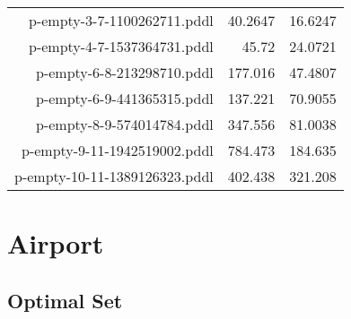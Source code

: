 \documentclass{article}
\begin{document}
\begin{center}
\begin{tabular}{r|r|r}
 p-empty-3-7-1100262711.pddl&40.2647&16.6247\\
 p-empty-4-7-1537364731.pddl&45.72&24.0721\\
 p-empty-6-8-213298710.pddl&177.016&47.4807\\
 p-empty-6-9-441365315.pddl&137.221&70.9055\\
 p-empty-8-9-574014784.pddl&347.556&81.0038\\
 p-empty-9-11-1942519002.pddl&784.473&184.635\\
 p-empty-10-11-1389126323.pddl&402.438&321.208
                            \end{tabular}
                            \end{center}
                    
                \newpage \section{Airport}
                    \subsection*{Optimal Set}
                    
\end{document}
